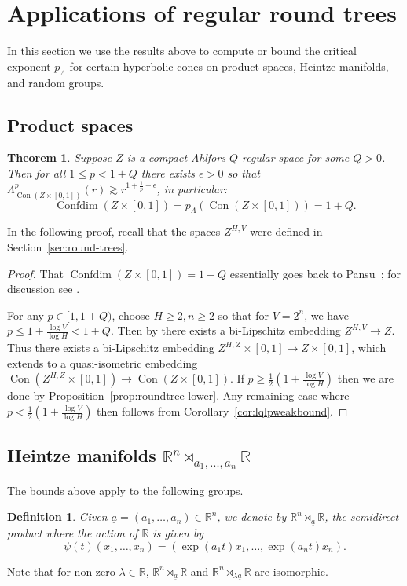 \documentclass[11pt]{amsart}
\numberwithin{equation}{section}
\newtheorem{theorem}[equation]{Theorem}
\newtheorem{definition}[equation]{Definition}
\theoremstyle{citing}
\DeclareMathOperator{\Cone}{Con}
\DeclareMathOperator{\Confdim}{Confdim}
\newcommand{\R}{\mathbb{R}}
\newcommand{\pcrit}{p_{\Lambda}}
\numberwithin{equation}{section}
\begin{document}
\section{Applications of regular round trees}
\label{sec:applications-reg-round-trees}
In this section we use the results above to compute or bound the critical exponent $\pcrit$ for certain hyperbolic cones on product spaces, Heintze manifolds, and random groups.

\subsection{Product spaces}
\begin{theorem}
	\label{thm:product-crit-exponent}
	Suppose $Z$ is a compact Ahlfors $Q$-regular space for some $Q>0$.
	Then for all $1 \leq p<1+Q$ there exists $\epsilon>0$ so that
	$\Lambda_{\Cone(Z \times [0,1])}^p(r) \gtrsim r^{1+\frac{1}{p}+\epsilon}$,
	in particular:
	\[
		\Confdim(Z \times [0,1]) = \pcrit(\Cone(Z \times [0,1])) = 1+Q.
	\]
\end{theorem}
In the following proof, recall that the spaces $Z^{H,V}$ were defined in Section~\ref{sec:round-trees}.
\begin{proof}
	That $\Confdim(Z \times [0,1])=1+Q$ essentially goes back to Pansu~\cite[Example 3.4]{Pan-89-cdim}; for discussion see \cite[Example 4.1.9]{Mac-Tys-cdimexpo}.

	For any $p \in [1,1+Q)$, choose $H \geq 2, n \geq 2$ so that for $V=2^n$, we have $p \leq 1+\frac{\log V}{\log H} < 1+Q$.
	Then by \cite[Theorem 3.1]{Mattila-Saaranen-09-existence-AR-cantor-subsets} there exists a bi-Lipschitz embedding $Z^{H,V} \to Z$.
	Thus there exists a bi-Lipschitz embedding $Z^{H,Z}\times[0,1] \to Z \times [0,1]$, which extends to a quasi-isometric embedding $\Cone(Z^{H,Z} \times [0,1]) \to \Cone(Z \times [0,1])$.
	If $p \geq \frac{1}{2}(1+\frac{\log V}{\log H})$ then we are done by Proposition~\ref{prop:roundtree-lower}.
	Any remaining case where $p < \frac{1}{2}(1+\frac{\log V}{\log H})$ then follows from Corollary~\ref{cor:lqlpweakbound}.
\end{proof}

\subsection{Heintze manifolds $\R^n\rtimes_{a_1,\ldots,a_n}\R$}

The bounds above apply to the following groups.
\begin{definition} Given $\underline{a}=(a_1,\ldots,a_n)\in\R^n$, we denote by $\R^n\rtimes_{\underline{a}}\R$, the semidirect product where the action of $\R$ is given by
\[
 \psi(t)(x_1,\ldots,x_n) = (\exp(a_1t)x_1,\ldots,\exp(a_nt)x_n).
\]
\end{definition}
Note that for non-zero $\lambda\in\R$, $\R^n\rtimes_{\underline{a}}\R$ and $\R^n\rtimes_{\lambda \underline{a}}\R$ are isomorphic.
\end{document}

